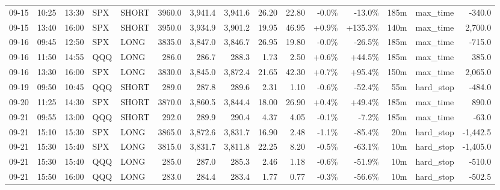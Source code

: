\documentclass[11pt,a4paper,twoside]{article}
\begin{document}
\begin{landscape}
\begin{center}
\begin{longtable}{>{\color{txtmain}}l l l l l r r r r r r r r >{\color{txtmain}}l r}
09-15 & 10:25 & 13:30 & SPX & SHORT & 3960.0 & 3,941.4 & 3,941.6 & 26.20 & 22.80 & \textcolor{lossred}{-0.0\%} & \textcolor{lossred}{-13.0\%} & 185m & max\_time & \textcolor{lossred}{-340.0} \\
09-15 & 13:40 & 16:00 & SPX & SHORT & 3950.0 & 3,934.9 & 3,901.2 & 19.95 & 46.95 & \textcolor{wingreen}{+0.9\%} & \textcolor{wingreen}{+135.3\%} & 140m & max\_time & \textcolor{wingreen}{2,700.0} \\
09-16 & 09:45 & 12:50 & SPX & LONG & 3835.0 & 3,847.0 & 3,846.7 & 26.95 & 19.80 & \textcolor{lossred}{-0.0\%} & \textcolor{lossred}{-26.5\%} & 185m & max\_time & \textcolor{lossred}{-715.0} \\
09-16 & 11:50 & 14:55 & QQQ & LONG & 286.0 & 286.7 & 288.3 & 1.73 & 2.50 & \textcolor{wingreen}{+0.6\%} & \textcolor{wingreen}{+44.5\%} & 185m & max\_time & \textcolor{wingreen}{385.0} \\
09-16 & 13:30 & 16:00 & SPX & LONG & 3830.0 & 3,845.0 & 3,872.4 & 21.65 & 42.30 & \textcolor{wingreen}{+0.7\%} & \textcolor{wingreen}{+95.4\%} & 150m & max\_time & \textcolor{wingreen}{2,065.0} \\
09-19 & 09:50 & 10:45 & QQQ & SHORT & 289.0 & 287.8 & 289.6 & 2.31 & 1.10 & \textcolor{lossred}{-0.6\%} & \textcolor{lossred}{-52.4\%} & 55m & hard\_stop & \textcolor{lossred}{-484.0} \\
09-20 & 11:25 & 14:30 & SPX & SHORT & 3870.0 & 3,860.5 & 3,844.4 & 18.00 & 26.90 & \textcolor{wingreen}{+0.4\%} & \textcolor{wingreen}{+49.4\%} & 185m & max\_time & \textcolor{wingreen}{890.0} \\
09-21 & 09:55 & 13:00 & QQQ & SHORT & 292.0 & 289.9 & 290.4 & 4.37 & 4.05 & \textcolor{lossred}{-0.1\%} & \textcolor{lossred}{-7.2\%} & 185m & max\_time & \textcolor{lossred}{-63.0} \\
09-21 & 15:10 & 15:30 & SPX & LONG & 3865.0 & 3,872.6 & 3,831.7 & 16.90 & 2.48 & \textcolor{lossred}{-1.1\%} & \textcolor{lossred}{-85.4\%} & 20m & hard\_stop & \textcolor{lossred}{-1,442.5} \\
09-21 & 15:30 & 15:40 & SPX & LONG & 3815.0 & 3,831.7 & 3,811.8 & 22.25 & 8.20 & \textcolor{lossred}{-0.5\%} & \textcolor{lossred}{-63.1\%} & 10m & hard\_stop & \textcolor{lossred}{-1,405.0} \\
09-21 & 15:30 & 15:40 & QQQ & LONG & 285.0 & 287.0 & 285.3 & 2.46 & 1.18 & \textcolor{lossred}{-0.6\%} & \textcolor{lossred}{-51.9\%} & 10m & hard\_stop & \textcolor{lossred}{-510.0} \\
09-21 & 15:50 & 16:00 & QQQ & LONG & 283.0 & 284.4 & 283.4 & 1.77 & 0.77 & \textcolor{lossred}{-0.3\%} & \textcolor{lossred}{-56.6\%} & 10m & hard\_stop & \textcolor{lossred}{-502.5} \\

\end{longtable}
\end{center}
\end{landscape}
\end{document}
